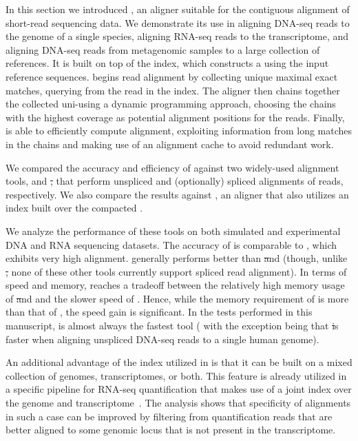 In this section we introduced \puffaligner, an aligner suitable for the
contiguous alignment of short-read sequencing data. We demonstrate its
use in aligning DNA-seq reads to the genome of a single species, aligning RNA-seq reads
to the transcriptome, and aligning DNA-seq reads from metagenomic samples to a 
large collection of references. It is built on top of the \pufferfish index, which constructs
a \ccdbg using the input reference sequences. \puffaligner begins read
alignment by collecting unique maximal exact matches, querying \kmers from the
read in the \pufferfish index. The aligner then chains together the collected
uni-\mems using a dynamic programming approach, choosing the chains with the
highest coverage as potential alignment positions for the reads. Finally,
\puffaligner is able to efficiently compute alignment,
exploiting information from long matches in the chains and making use of an 
alignment cache to avoid redundant work.

We compared the accuracy and efficiency of \puffaligner against two
widely-used alignment tools, \bt and \st, that perform unspliced and
(optionally) spliced alignments of reads, respectively. We also compare
the results against \debga, an aligner that also utilizes an index built
over the compacted \dbg.

We analyze the performance of these tools on both simulated and
experimental DNA and RNA sequencing datasets. The accuracy of
\puffaligner is comparable to \bt, which exhibits very high  
alignment. \puffaligner generally performs better than \st and \debga
(though, unlike \st, none of these other tools currently support spliced read
alignment). In terms of speed and memory, \puffaligner reaches a tradeoff
between the relatively high memory usage of \st and \debga and the slower
speed of \bt. Hence, while the memory requirement of \puffaligner is more
than that of \bt, the speed gain is significant.  In the tests performed 
in this manuscript, \puffaligner is almost always the fastest tool (
with the exception being that \st is faster when aligning unspliced 
DNA-seq reads to a single human genome).

An additional advantage of the \pufferfish index utilized in \puffaligner
is that it can be built on a mixed collection of genomes, transcriptomes,
or both. This feature is already utilized in a specific pipeline for
RNA-seq quantification that makes use of a joint index over the genome 
and transcriptome~\citep{srivastava2019alignment}. The analysis shows 
that specificity of alignments in such a case can be improved by filtering 
from quantification reads that are better aligned to some genomic locus 
that is not present in the transcriptome.


